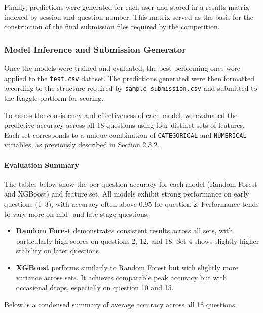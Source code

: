 \documentclass[12pt]{article}
\begin{document}
	Finally, predictions were generated for each user and stored in a results matrix indexed by session and question number. This matrix served as the basis for the construction of the final submission files required by the competition.
	
	
	\subsubsection{Model Inference and Submission Generator}
	
	Once the models were trained and evaluated, the best-performing ones were applied to the \texttt{test.csv} dataset. The predictions generated were then formatted according to the structure required by \texttt{sample\_submission.csv} and submitted to the Kaggle platform for scoring.
	
	To assess the consistency and effectiveness of each model, we evaluated the predictive accuracy across all 18 questions using four distinct sets of features. Each set corresponds to a unique combination of \texttt{CATEGORICAL} and \texttt{NUMERICAL} variables, as previously described in Section 2.3.2.
	
	\vspace{0.5em}
	\paragraph{Evaluation Summary}
	
	The tables below show the per-question accuracy for each model (Random Forest and XGBoost) and feature set. All models exhibit strong performance on early questions (1–3), with accuracy often above 0.95 for question 2. Performance tends to vary more on mid- and late-stage questions.
	
	\vspace{0.5em}
	\begin{itemize}
		\item \textbf{Random Forest} demonstrates consistent results across all sets, with particularly high scores on questions 2, 12, and 18. Set 4 shows slightly higher stability on later questions.
		\item \textbf{XGBoost} performs similarly to Random Forest but with slightly more variance across sets. It achieves comparable peak accuracy but with occasional drops, especially on question 10 and 15.
	\end{itemize}
	
	\noindent Below is a condensed summary of average accuracy across all 18 questions:
	
\end{document}
